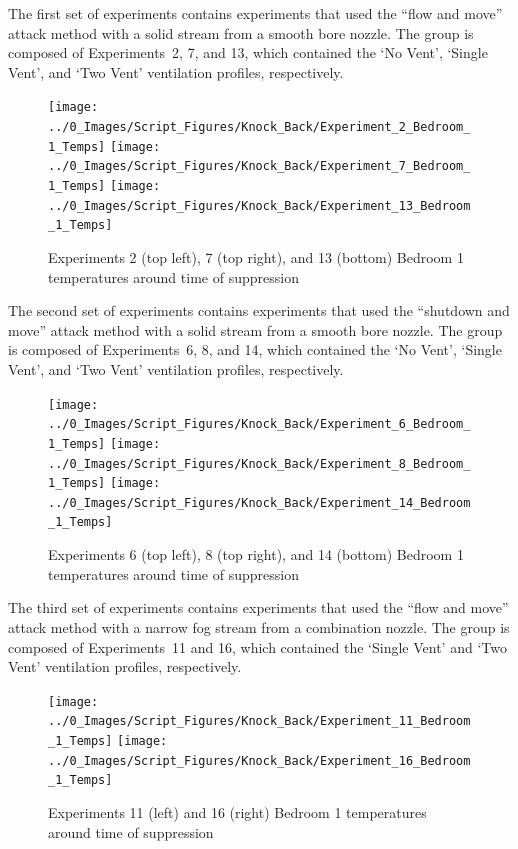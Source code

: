 \documentclass[12pt,oneside]{book}
\begin{document}
The first set of experiments contains experiments that used the ``flow and move'' attack method with a solid stream from a smooth bore nozzle. The group is composed of Experiments~2, 7, and 13, which contained the `No Vent', `Single Vent', and `Two Vent' ventilation profiles, respectively.

\begin{figure}[H]
	\centering
	\texttt{[image: ../0\_Images/Script\_Figures/Knock\_Back/Experiment\_2\_Bedroom\_1\_Temps]}
	\texttt{[image: ../0\_Images/Script\_Figures/Knock\_Back/Experiment\_7\_Bedroom\_1\_Temps]}
	\texttt{[image: ../0\_Images/Script\_Figures/Knock\_Back/Experiment\_13\_Bedroom\_1\_Temps]}
	\caption[]{Experiments 2 (top left), 7 (top right), and 13 (bottom) Bedroom 1 temperatures around time of suppression}
	\label{fig:knockback_int_1}
\end{figure}
\clearpage

The second set of experiments contains experiments that used the ``shutdown and move'' attack method with a solid stream from a smooth bore nozzle. The group is composed of Experiments~6, 8, and 14, which contained the `No Vent', `Single Vent', and `Two Vent' ventilation profiles, respectively.

\begin{figure}[!ht]
	\centering
	\texttt{[image: ../0\_Images/Script\_Figures/Knock\_Back/Experiment\_6\_Bedroom\_1\_Temps]}
	\texttt{[image: ../0\_Images/Script\_Figures/Knock\_Back/Experiment\_8\_Bedroom\_1\_Temps]}
	\texttt{[image: ../0\_Images/Script\_Figures/Knock\_Back/Experiment\_14\_Bedroom\_1\_Temps]}
	\caption[]{Experiments 6 (top left), 8 (top right), and 14 (bottom) Bedroom 1 temperatures around time of suppression}
	\label{fig:knockback_int_2}
\end{figure}
\clearpage

The third set of experiments contains experiments that used the ``flow and move'' attack method with a narrow fog stream from a combination nozzle. The group is composed of Experiments~11 and 16, which contained the `Single Vent' and `Two Vent' ventilation profiles, respectively.

\begin{figure}[H]
	\centering
	\texttt{[image: ../0\_Images/Script\_Figures/Knock\_Back/Experiment\_11\_Bedroom\_1\_Temps]}
	\texttt{[image: ../0\_Images/Script\_Figures/Knock\_Back/Experiment\_16\_Bedroom\_1\_Temps]}
	\caption[]{Experiments 11 (left) and 16 (right) Bedroom 1 temperatures around time of suppression}
	\label{fig:knockback_int_3}
\end{figure}
\clearpage
\end{document}
